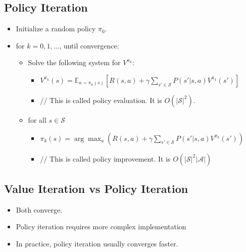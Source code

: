 \documentclass[10pt]{article}
\begin{document}
\subsection*{Policy Iteration}
\begin{itemize}
	\item Initialize a random policy $\pi_0$.
	\item for $k = 0, 1, \dots$, until convergence:
	\begin{itemize}
        \item Solve the following system for $V^{\pi_k}$:
        \begin{itemize}
            \item $V^{\pi_k}(s) = \mathbb{E}_{a \sim \pi_k(s)} \left[R(s, a) + \gamma \sum_{s' \in \mathcal{S}} P(s' | s, a) V^{\pi_k} (s')\right]$
        \item // This is called policy evaluation.  It is $O(|\mathcal{S}|^2)$.
        \end{itemize}
        \item for all $s \in \mathcal{S}$
        \begin{itemize}
            \item $\pi_k(s) = \arg \max_a \left(R(s, a) + \gamma \sum_{s' \in \mathcal{S}} P(s' | s, a) V^{\pi_k} (s')\right)$
            \item // This is called policy improvement.  It is $O(|\mathcal{S}|^2 |\mathcal{A}|)$
        \end{itemize}
    \end{itemize}
\end{itemize}

\subsection*{Value Iteration vs Policy Iteration}
\begin{itemize}
	\item Both converge. 
	\item Policy iteration requires more complex implementation
	\item In practice, policy iteration usually converges faster.
\end{itemize}
\end{document}

